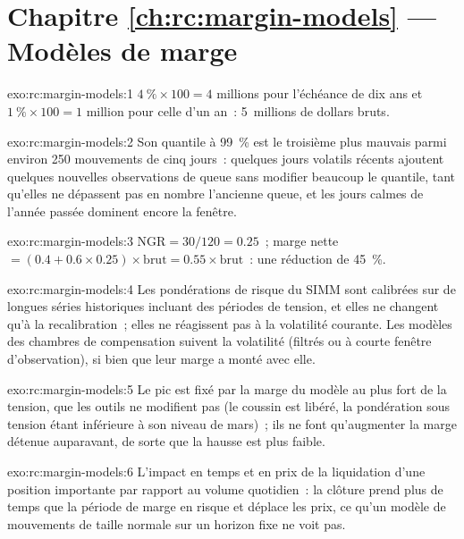 \section*{Chapitre \ref{ch:rc:margin-models} --- Modèles de marge}

\begin{solution}{exo:rc:margin-models:1}
$4~\%\times100 = 4$ millions pour l'échéance de dix ans et $1~\%\times100 = 1$ million pour celle d'un an~: 5~millions de dollars bruts.
\end{solution}

\begin{solution}{exo:rc:margin-models:2}
Son quantile à 99~\% est le troisième plus mauvais parmi environ 250 mouvements de cinq jours~: quelques jours volatils récents ajoutent quelques
nouvelles observations de queue sans modifier beaucoup le quantile, tant qu'elles ne dépassent pas en nombre l'ancienne queue, et les jours calmes
de l'année passée dominent encore la fenêtre.
\end{solution}

\begin{solution}{exo:rc:margin-models:3}
$\mathrm{NGR} = 30/120 = 0.25$~; marge nette $= (0.4+0.6\times0.25)\times\text{brut} = 0.55\times\text{brut}$~: une réduction de 45~\%.
\end{solution}

\begin{solution}{exo:rc:margin-models:4}
Les pondérations de risque du SIMM sont calibrées sur de longues séries historiques incluant des périodes de tension, et elles ne changent
qu'à la recalibration~; elles ne réagissent pas à la volatilité courante. Les modèles des chambres de compensation suivent la volatilité (filtrés
ou à courte fenêtre d'observation), si bien que leur marge a monté avec elle.
\end{solution}

\begin{solution}{exo:rc:margin-models:5}
Le pic est fixé par la marge du modèle au plus fort de la tension, que les outils ne modifient pas (le
coussin est libéré, la pondération sous tension étant inférieure à son niveau de mars)~; ils ne font qu'augmenter la marge détenue
auparavant, de sorte que la hausse est plus faible.
\end{solution}

\begin{solution}{exo:rc:margin-models:6}
L'impact en temps et en prix de la liquidation d'une position importante par rapport au volume quotidien~: la clôture
prend plus de temps que la période de marge en risque et déplace les prix, ce qu'un modèle de mouvements de taille normale sur un
horizon fixe ne voit pas.
\end{solution}

